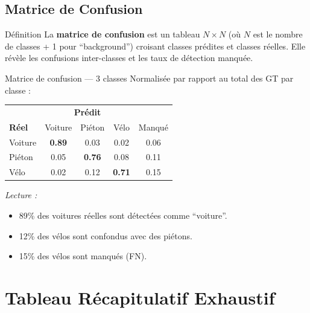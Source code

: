 \documentclass[12pt, a4paper]{report}
\begin{document}
\section{Matrice de Confusion}

\begin{definitionbox}{Définition}
  La \textbf{matrice de confusion} est un tableau $N \times N$ (où $N$ est le
  nombre de classes + 1 pour ``background'') croisant classes prédites et classes
  réelles. Elle révèle les confusions inter-classes et les taux de détection
  manquée.
\end{definitionbox}

\begin{examplebox}{Matrice de confusion — 3 classes}
  Normalisée par rapport au total des GT par classe :
  \begin{center}
  \begin{tabular}{l|ccc|c}
    \toprule
    & \multicolumn{3}{c|}{\textbf{Prédit}} & \\
    \textbf{Réel} & Voiture & Piéton & Vélo & Manqué \\
    \midrule
    Voiture & \cellcolor{yologreen!40}\textbf{0.89} & 0.03 & 0.02 & 0.06 \\
    Piéton  & 0.05 & \cellcolor{yologreen!40}\textbf{0.76} & 0.08 & 0.11 \\
    Vélo    & 0.02 & 0.12 & \cellcolor{yologreen!40}\textbf{0.71} & 0.15 \\
    \bottomrule
  \end{tabular}
  \end{center}

  \textit{Lecture :}
  \begin{itemize}
    \item 89\% des voitures réelles sont détectées comme ``voiture''.
    \item 12\% des vélos sont confondus avec des piétons.
    \item 15\% des vélos sont manqués (FN).
  \end{itemize}
\end{examplebox}

\chapter{Tableau Récapitulatif Exhaustif}
\end{document}

